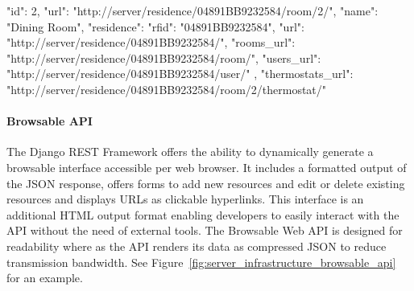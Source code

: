 \begin{snippet}[language=JavaScript,label={lst:room-json-example},caption={Example representation of the Room resource at \nolinkurl{http://server/residence/04891BB9232584/room/2/}. The \emph{url} field determines the URL of the represented resource. Within the \emph{residence} field the representation of the associated Residence resource is nested. The included Residence representation has its own \emph{url} field. Collections of the Residence's Rooms and Users are not nested but referenced via URL to limit the response size.}]
	{
		"id": 2,
		"url": "http://server/residence/04891BB9232584/room/2/",
		"name": "Dining Room",
		"residence": {
			"rfid": "04891BB9232584",
			"url": "http://server/residence/04891BB9232584/",
			"rooms_url": "http://server/residence/04891BB9232584/room/",
			"users_url": "http://server/residence/04891BB9232584/user/"
		},
		"thermostats_url": "http://server/residence/04891BB9232584/room/2/thermostat/"
	}
\end{snippet}


\paragraph{Browsable API}

The Django REST Framework offers the ability to dynamically generate a browsable interface accessible per web browser.
It includes a formatted output of the JSON response, offers forms to add new resources and edit or delete existing resources and displays URLs as clickable hyperlinks.
This interface is an additional HTML output format enabling developers to easily interact with the API without the need of external tools.
The Browsable Web API is designed for readability where as the API renders its data as compressed JSON to reduce transmission bandwidth.
See Figure~\ref{fig:server_infrastructure_browsable_api} for an example.

